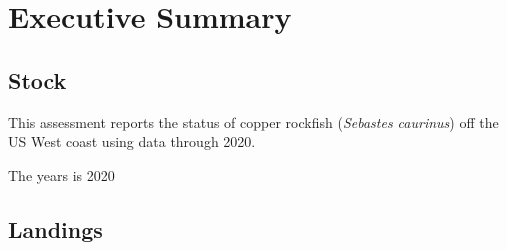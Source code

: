 \documentclass[11pt,
  english,
  a4paper,
]{article}
\begin{document}
\newcommand{\lt}{\ensuremath <}
\newcommand{\gt}{\ensuremath >}

\newlength{\cslhangindent}
\setlength{\cslhangindent}{1.5em}
\newenvironment{cslreferences}%
  {\setlength{\parindent}{0pt}%
  \everypar{\setlength{\hangindent}{\cslhangindent}}\ignorespaces}%
  {\par}

\pagebreak
{}
\setcounter{page}{1}
\setcounter{figure}{0}
\setcounter{table}{0}
\renewcommand{\thetable}{\roman{table}}
\renewcommand{\thefigure}{\roman{figure}}


\hypertarget{executive-summary}{%
\section*{Executive Summary}\label{executive-summary}}

\leavevmode\tagmcend\tagstructend


\hypertarget{stock}{%
\subsection*{Stock}\label{stock}}

\leavevmode\tagmcend\tagstructend


This assessment reports the status of copper rockfish (\emph{Sebastes caurinus}) off the US West coast using data through 2020.

\leavevmode\tagmcend\tagstructend\par


The years is 2020

\leavevmode\tagmcend\tagstructend\par


\hypertarget{landings}{%
\subsection*{Landings}\label{landings}}
\end{document}
